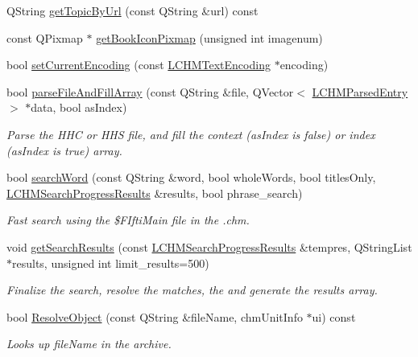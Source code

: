 \begin{DoxyCompactItemize}
Q\+String \hyperlink{classLCHMFileImpl_af5c1957e8dbcc4c4a06186d766e222be}{get\+Topic\+By\+Url} (const Q\+String \&url) const 
\item 
const Q\+Pixmap $\ast$ \hyperlink{classLCHMFileImpl_ad0b8a4f3e8949c4f713919cf4aa10683}{get\+Book\+Icon\+Pixmap} (unsigned int imagenum)
\item 
bool \hyperlink{classLCHMFileImpl_afa8e9063a88e0a8090b3412b49e67f9e}{set\+Current\+Encoding} (const \hyperlink{structLCHMTextEncoding}{L\+C\+H\+M\+Text\+Encoding} $\ast$encoding)
\item 
bool \hyperlink{classLCHMFileImpl_a7d59bfdee96e603b0cd1e19f9bf37448}{parse\+File\+And\+Fill\+Array} (const Q\+String \&file, Q\+Vector$<$ \hyperlink{structLCHMParsedEntry}{L\+C\+H\+M\+Parsed\+Entry} $>$ $\ast$data, bool as\+Index)
\begin{DoxyCompactList}\small\item\em Parse the H\+H\+C or H\+H\+S file, and fill the context (as\+Index is false) or index (as\+Index is true) array. \end{DoxyCompactList}\item 
bool \hyperlink{classLCHMFileImpl_aef2f435b859a816d543af610ed65316e}{search\+Word} (const Q\+String \&word, bool whole\+Words, bool titles\+Only, \hyperlink{libchmfileimpl_8h_a49915bbafbeae4acb86601a1e4f0c247}{L\+C\+H\+M\+Search\+Progress\+Results} \&results, bool phrase\+\_\+search)
\begin{DoxyCompactList}\small\item\em Fast search using the \$\+F\+Ifti\+Main file in the .chm. \end{DoxyCompactList}\item 
void \hyperlink{classLCHMFileImpl_ace9ea6df1f8aa45d2ef89052aa953e19}{get\+Search\+Results} (const \hyperlink{libchmfileimpl_8h_a49915bbafbeae4acb86601a1e4f0c247}{L\+C\+H\+M\+Search\+Progress\+Results} \&tempres, Q\+String\+List $\ast$results, unsigned int limit\+\_\+results=500)
\begin{DoxyCompactList}\small\item\em Finalize the search, resolve the matches, the and generate the results array. \end{DoxyCompactList}\item 
bool \hyperlink{classLCHMFileImpl_a78d3e549251cd4c842aecca5aa1ede36}{Resolve\+Object} (const Q\+String \&file\+Name, chm\+Unit\+Info $\ast$ui) const 
\begin{DoxyCompactList}\small\item\em Looks up file\+Name in the archive. \end{DoxyCompactList}\item 

\end{DoxyCompactItemize}

